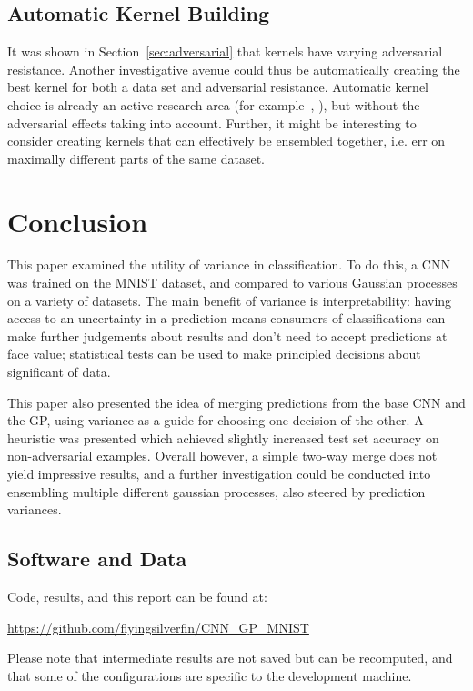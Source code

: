 \documentclass{article}
\begin{document}
\subsection{Automatic Kernel Building}
It was shown in Section~\ref{sec:adversarial} that kernels have varying adversarial resistance. Another investigative avenue could thus be automatically creating the best kernel for both a data set and adversarial resistance. Automatic kernel choice is already an active research area (for example~\cite{abdessalem2017automatic}, \cite{duvenaud2014automatic}), but without the adversarial effects taking into account. Further, it might be interesting to consider creating kernels that can effectively be ensembled together, i.e. err on maximally different parts of the same dataset.

\section{Conclusion}

This paper examined the utility of variance in classification. To do this, a CNN was trained on the MNIST dataset, and compared to various Gaussian processes on a variety of datasets. The main benefit of variance is interpretability: having access to an uncertainty in a prediction means consumers of classifications can make further judgements about results and don't need to accept predictions at face value; statistical tests can be used to make principled decisions about significant of data.

This paper also presented the idea of merging predictions from the base CNN and the GP, using variance as a guide for choosing one decision of the other. A heuristic was presented which achieved slightly increased test set accuracy on non-adversarial examples. Overall however, a simple two-way merge does not yield impressive results, and a further investigation could be conducted into ensembling multiple different gaussian processes, also steered by prediction variances.

\subsection{Software and Data}

Code, results, and this report can be found at:

\url{https://github.com/flyingsilverfin/CNN_GP_MNIST}

Please note that intermediate results are not saved but can be recomputed, and that some of the configurations are specific to the development machine. %







\appendix
\end{document}
